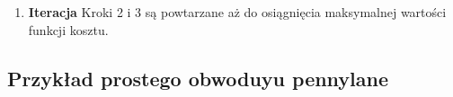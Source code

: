 \begin{tcolorbox}[title=Algorytm trenowania głębokiej sieci kwantowej,
    colback=blue!5!white,colframe=blue!75!black,
    breakable]
\begin{enumerate}
\begin{enumerate}
\begin{itemize}
\[                \prod_{\alpha=j+1}^{m_l}{U_{\alpha}^l}^{\dagger} (\mathbb{I}_{l-1}\otimes \sigma_x^l)\prod_{\alpha=m_l}^{j+1}U_{\alpha}^l\right]\]
            \end{itemize}
            \item \textbf{Aktualizacja operatorów unitarnych} Dla każdej warstwy l i każdego perceptronu j wykonane zostają operacje unitarne:
        \[U_j^l(s+1) = e^{i\epsilon K_j^l(s)}U_j^l(s)\]
            \item Zwiększ krok $s = s + \epsilon$ 
        \end{enumerate}
        \item \textbf{Iteracja} Kroki 2 i 3 są powtarzane aż do osiągnięcia maksymalnej wartości funkcji kosztu.
            
    \end{enumerate}

\end{tcolorbox}

\subsection{Przykład prostego obwoduyu pennylane}